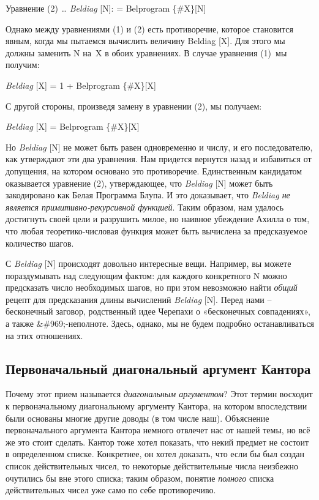 \documentclass[../main.tex]{subfiles}
\begin{document}
Уравнение (2) \ldots{} \emph{Beldiag} {[}N{]}: = Belprogram \{\#X\}{[}N{]}

Однако между уравнениями (1) и (2) есть противоречие, которое становится явным, когда мы пытаемся вычислить величину Beldiag {[}X{]}. Для этого мы должны заменить N на~X в обоих уравнениях. В случае уравнения (1)~мы получим:

\emph{Beldiag} {[}X{]} = 1 + Belprogram \{\#X\}{[}X{]}

С другой стороны, произведя замену в уравнении (2), мы получаем:

\emph{Beldiag} {[}X{]} = Belprogram \{\#X\}{[}X{]}

Но \emph{Beldiag} {[}N{]} не может быть равен одновременно и числу, и его последователю, как утверждают эти два уравнения. Нам придется вернутся назад и избавиться от допущения, на котором основано это противоречие. Единственным кандидатом оказывается уравнение (2), утверждающее, что \emph{Beldiag} {[}N{]} может быть закодировано как Белая Программа Блупа. И это доказывает, что \emph{Beldiag не является примитивно-рекурсивной функцией}. Таким образом, нам удалось достигнуть своей цели и разрушить милое, но наивное убеждение Ахилла о том, что любая теоретико-числовая функция может быть вычислена за предсказуемое количество шагов.

С \emph{Beldiag} {[}N{]} происходят довольно интересные вещи. Например, вы можете пораздумывать над следующим фактом: для каждого конкретного N можно предсказать число необходимых шагов, но при этом невозможно найти \emph{общий} рецепт для предсказания длины вычислений \emph{Beldiag} {[}N{]}. Перед нами \--- бесконечный заговор, родственный идее Черепахи о «бесконечных совпадениях», а также \&\#969;-неполноте. Здесь, однако, мы не будем подробно останавливаться на этих отношениях.


\subsection{Первоначальный диагональный аргумент Кантора}

Почему этот прием называется \emph{диагональным аргументом}? Этот термин восходит к первоначальному диагональному аргументу Кантора, на котором впоследствии были основаны многие другие доводы (в том числе наш). Объяснение первоначального аргумента Кантора немного отвлечет нас от нашей темы, но всё же это стоит сделать. Кантор тоже хотел показать, что некий предмет не состоит в определенном списке. Конкретнее, он хотел доказать, что если бы был создан список действительных чисел, то некоторые действительные числа неизбежно очутились бы вне этого списка; таким образом, понятие \emph{полного} списка действительных чисел уже само по себе противоречиво.
\end{document}
